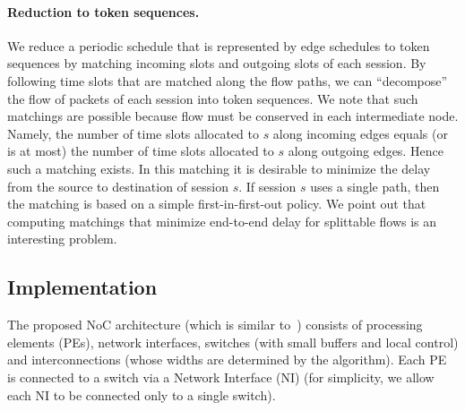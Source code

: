 \documentclass[a4paper,12pt]{article}
\newenvironment{proof sketch}[1]{\noindent {\emph{Proof sketch of #1:}}}{\hfill \qed}
\begin{document}
\paragraph{Reduction to token sequences.}
We reduce a periodic schedule that is represented by edge schedules to token
sequences by matching incoming slots and outgoing slots of each session. By following
time slots that are matched along the flow paths, we can ``decompose'' the flow of
packets of each session into token sequences. We note that such matchings are
possible because flow must be conserved in each intermediate node.  Namely, the
number of time slots allocated to $s$ along incoming edges equals (or is at most) the
number of time slots allocated to $s$ along outgoing edges.  Hence such a matching
exists. In this matching it is desirable to minimize the delay from the source to
destination of session $s$.  If session $s$ uses a single path, then the matching is
based on a simple first-in-first-out policy. We point out that computing matchings
that minimize end-to-end delay for splittable flows is an interesting problem.
\begin{comment}
  THIS DOES NOT WORK: interesting question compute matching with splitted flow...
  For this purpose we sort the nodes in topological order induced by the flow paths
  of session $s$.  We mark the time slots allocated to $s$ in the edges emanating
  from the nodes by the number of time slots that elapsed since they left they
  destination, and the matching attempt to minimize the We scan the nodes in this
  topological order to compute the matching in each node for $s$. The time slots of
  edges emanating from the source of $s$ are labeled by their time slot.  Each time
  slot allocated for session $s$ in each in Hence, for every node $v$ and session $s$
  we construct a complete bi-partite graph $G_{v,s}$. The vertices on the left
  (resp., right) side correspond to time slots in incoming (resp. outgoing) edges
  that are allocated to $s$. The weight of an edge from a node corresponding to time
  slot $t_1$ to a node corresponding to time slot $t_2$
\end{comment}

\subsection{Implementation}
The proposed NoC architecture (which is similar
to~\cite{murali2004bandwidth,sorensen2014metaheuristic}) consists of
processing elements (PEs), network interfaces, switches (with small buffers and local
control) and interconnections (whose widths are determined by the algorithm). Each PE
is connected to a switch via a Network Interface (NI) (for simplicity, we allow each
NI to be connected only to a single switch).
\end{document}
